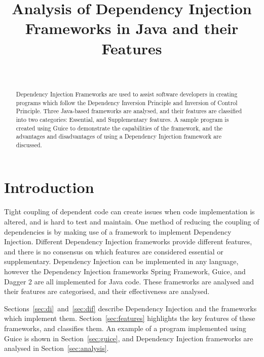 \documentclass[12pt,twocolumn]{IEEEtran}
\begin{document}
	\onecolumn
	\title{Analysis of Dependency Injection Frameworks in Java and their Features}
	
	\author{\\
		}
	
	\maketitle
	
	\begin{abstract}
		Dependency Injection Frameworks are used to assist software developers in creating programs which follow the Dependency Inversion Principle and Inversion of Control Principle. Three Java-based frameworks are analysed, and their features are classified into two categories: Essential, and Supplementary features. A sample program is created using Guice to demonstrate the capabilities of the framework, and the advantages and disadvantages of using a Dependency Injection framework are discussed.
	\end{abstract}

\thispagestyle{empty}
\setcounter{page}{0}
\twocolumn
\clearpage

\section{Introduction}

Tight coupling of dependent code can create issues when code implementation is altered, and is hard to test and maintain. One method of reducing the coupling of dependencies is by making use of a framework to implement Dependency Injection. Different Dependency Injection frameworks provide different features, and there is no consensus on which features are considered essential or supplementary. Dependency Injection can be implemented in any language, however the Dependency Injection frameworks Spring Framework, Guice, and Dagger 2 are all implemented for Java code. These frameworks are analysed and their features are categorised, and their effectiveness are analysed.

Sections~\ref{sec:di}~and~\ref{sec:dif} describe Dependency Injection and the frameworks which implement them. Section~\ref{sec:features} highlights the key features of these frameworks, and classifies them. An example of a program implemented using Guice is shown in Section~\ref{sec:guice}, and Dependency Injection frameworks are analysed in Section~\ref{sec:analysis}.
\end{document}

